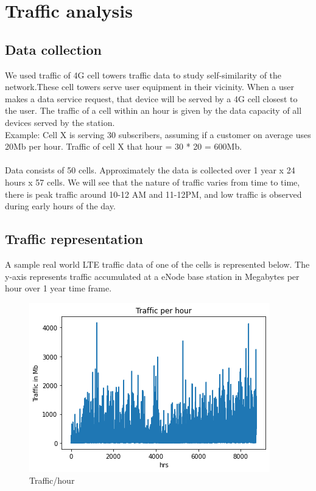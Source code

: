 \chapter{Traffic analysis}

\section{Data collection}

We used traffic of 4G cell towers traffic data to study self-similarity of the network.These cell towers serve user equipment in their vicinity. When a user makes a data service request, that device will be served by a 4G cell closest to the user. The traffic of a cell within an hour is given by the data capacity of all devices served by the station. 
\\Example: Cell X is serving 30 subscribers, assuming if a customer on average uses 20Mb per hour. Traffic of cell X that hour = 30 * 20 = 600Mb.\\\\
Data consists of 50 cells. Approximately the data is collected over 1 year x 24 hours x 57 cells.
We will see that the nature of traffic varies from time to time, there is peak traffic around 10-12 AM and 11-12PM, and low traffic is observed during early hours of the day.

\section{Traffic representation}

A sample real world LTE traffic data of one of the cells is represented below. The y-axis represents traffic accumulated at a eNode base station in Megabytes per hour over 1 year time frame.
\begin{figure}[H]
    \centering
    \includegraphics{traffic_per_hour.png}
    \caption{Traffic/hour}
    \label{fig:traffic_per_hour}
\end{figure}

